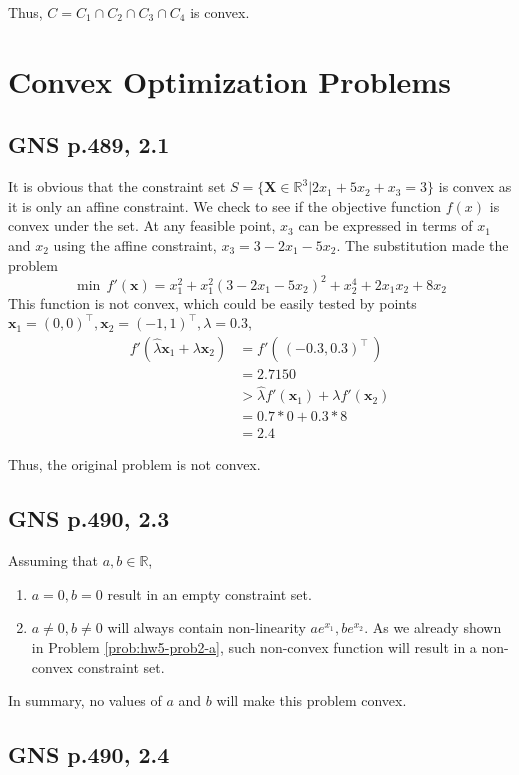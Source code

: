 Thus, $C = C_1 \cap C_2 \cap C_3 \cap C_4$ is convex.  

\section{Convex Optimization Problems}

\subsection{GNS p.489, 2.1}
It is obvious that the constraint set $S = \{\mathbf X \in \mathbb{R}^3 | 2x_1+5x_2+x_3=3\}$ is convex as it is only an affine constraint. We check to see if the objective function $f(x)$ is convex under the set. At any feasible point, $x_3$ can be expressed in terms of $x_1$ and $x_2$ using the affine constraint, $x_3 = 3 - 2x_1- 5x_2$. The substitution made the problem
\[
\min\, f'(\mathbf{x}) = x_1^2+x_1^2(3 - 2x_1 - 5x_2)^2+x_2^4+2x_1x_2+8x_2
\]
This function is not convex, which could be easily tested by points $\mathbf{x}_1 = (0, 0)^\intercal, \mathbf{x}_2 = (-1, 1)^\intercal, \lambda = 0.3$,
\begin{align*}
f'(\hat\lambda \mathbf{x}_1 + \lambda \mathbf{x}_2) &= f'(\,(-0.3, 0.3)^\intercal\,)\\
&= 2.7150 \\
&> \hat\lambda f'(\mathbf{x}_1) + \lambda f'(\mathbf{x}_2) \\
&= 0.7 * 0 + 0.3 * 8 \\
&= 2.4
\end{align*}

Thus, the original problem is not convex.

\subsection{GNS p.490, 2.3}

Assuming that $a, b \in \mathbb{R}$, 
\begin{enumerate}
\item $a = 0, b = 0$ result in an empty constraint set.
\item $a \neq 0, b \neq 0$ will always contain non-linearity $ae^{x_1}, be^{x_2}$. As we already shown in Problem \ref{prob:hw5-prob2-a}, such non-convex function will result in a non-convex constraint set.
\end{enumerate}

In summary, no values of $a$ and $b$ will make this problem convex. 

\subsection{GNS p.490, 2.4}

